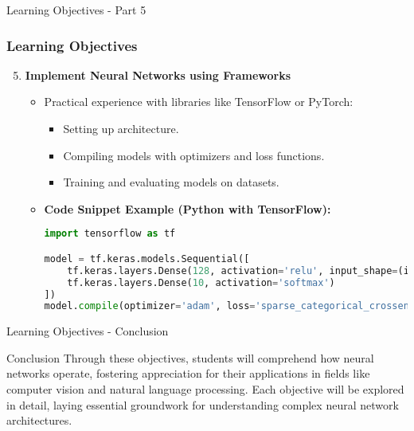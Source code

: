 \documentclass[aspectratio=169]{beamer}
\begin{document}
\begin{frame}[fragile]{Learning Objectives - Part 5}
    \frametitle{Learning Objectives}
    \begin{enumerate}
        \setcounter{enumi}{4}
        \item \textbf{Implement Neural Networks using Frameworks}
            \begin{itemize}
                \item Practical experience with libraries like TensorFlow or PyTorch:
                    \begin{itemize}
                        \item Setting up architecture.
                        \item Compiling models with optimizers and loss functions.
                        \item Training and evaluating models on datasets.
                    \end{itemize}
                \item \textbf{Code Snippet Example (Python with TensorFlow):}
                \begin{lstlisting}[language=Python]
import tensorflow as tf

model = tf.keras.models.Sequential([
    tf.keras.layers.Dense(128, activation='relu', input_shape=(input_dim,)),
    tf.keras.layers.Dense(10, activation='softmax')
])
model.compile(optimizer='adam', loss='sparse_categorical_crossentropy', metrics=['accuracy'])
                \end{lstlisting}
            \end{itemize}
    \end{enumerate}
\end{frame}

\begin{frame}[fragile]{Learning Objectives - Conclusion}
    \begin{block}{Conclusion}
        Through these objectives, students will comprehend how neural networks operate, fostering appreciation for their applications in fields like computer vision and natural language processing. Each objective will be explored in detail, laying essential groundwork for understanding complex neural network architectures.
    \end{block}
\end{frame}
\end{document}
